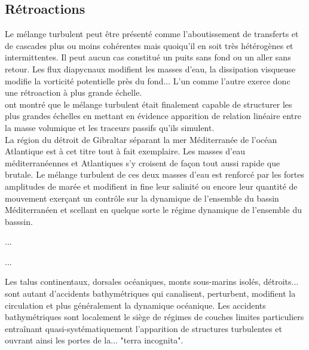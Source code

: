\color{blue}
\subsection{Rétroactions}
Le mélange turbulent peut être présenté comme l'aboutissement de transferts et de cascades plus ou moins cohérentes mais quoiqu'il en soit très hétérogènes et intermittentes. Il peut aucun cas constitué un puits sans fond ou un aller sans retour. Les flux diapycnaux modifient les masses d'eau, la dissipation visqueuse modifie la vorticité potentielle près du fond... L'un comme l'autre exerce donc une rétroaction à plus grande échelle.\\
\citep{penney_2020} ont montré que le mélange turbulent était finalement capable de structurer les plus grandes échelles en mettant en évidence apparition de relation linéaire entre la masse volumique et les traceurs passifs qu'ils simulent.\\
La région du détroit de Gibraltar séparant la mer Méditerranée de l'océan Atlantique est à cet titre tout à fait exemplaire. Les masses d'eau méditerranéennes et Atlantiques s'y croisent de façon tout aussi rapide que brutale. Le mélange turbulent de ces deux masses d'eau est renforcé par les fortes amplitudes de marée et modifient in fine leur salinité ou encore leur quantité de mouvement exerçant un contrôle sur la dynamique de l'ensemble du bassin Méditerranéen \citep{armi_1988} et scellant en quelque sorte le régime dynamique de l'ensemble du basssin.
\color{black}

...



...

Les talus continentaux, dorsales océaniques, monts sous-marins isolés, détroits... sont autant d'accidents bathymétriques qui canalisent, perturbent, modifient la circulation et plus généralement la dynamique océanique. Les accidents bathymétriques sont localement le siège de régimes de couches limites particuliers entraînant quasi-systématiquement l'apparition de structures turbulentes et ouvrant ainsi les portes de la... "terra incognita".

